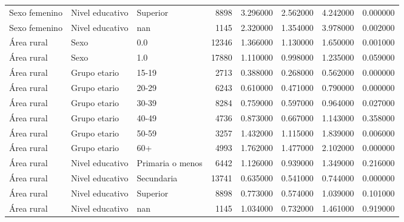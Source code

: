 \begin{longtable}{lllrrrrr}
Sexo femenino & Nivel educativo & Superior & 8898 & 3.296000 & 2.562000 & 4.242000 & 0.000000 \\
Sexo femenino & Nivel educativo & nan & 1145 & 2.320000 & 1.354000 & 3.978000 & 0.002000 \\
Área rural & Sexo & 0.0 & 12346 & 1.366000 & 1.130000 & 1.650000 & 0.001000 \\
Área rural & Sexo & 1.0 & 17880 & 1.110000 & 0.998000 & 1.235000 & 0.059000 \\
Área rural & Grupo etario & 15-19 & 2713 & 0.388000 & 0.268000 & 0.562000 & 0.000000 \\
Área rural & Grupo etario & 20-29 & 6243 & 0.610000 & 0.471000 & 0.790000 & 0.000000 \\
Área rural & Grupo etario & 30-39 & 8284 & 0.759000 & 0.597000 & 0.964000 & 0.027000 \\
Área rural & Grupo etario & 40-49 & 4736 & 0.873000 & 0.667000 & 1.143000 & 0.358000 \\
Área rural & Grupo etario & 50-59 & 3257 & 1.432000 & 1.115000 & 1.839000 & 0.006000 \\
Área rural & Grupo etario & 60+ & 4993 & 1.762000 & 1.477000 & 2.102000 & 0.000000 \\
Área rural & Nivel educativo & Primaria o menos & 6442 & 1.126000 & 0.939000 & 1.349000 & 0.216000 \\
Área rural & Nivel educativo & Secundaria & 13741 & 0.635000 & 0.541000 & 0.744000 & 0.000000 \\
Área rural & Nivel educativo & Superior & 8898 & 0.773000 & 0.574000 & 1.039000 & 0.101000 \\
Área rural & Nivel educativo & nan & 1145 & 1.034000 & 0.732000 & 1.461000 & 0.919000 \\
\end{longtable}
